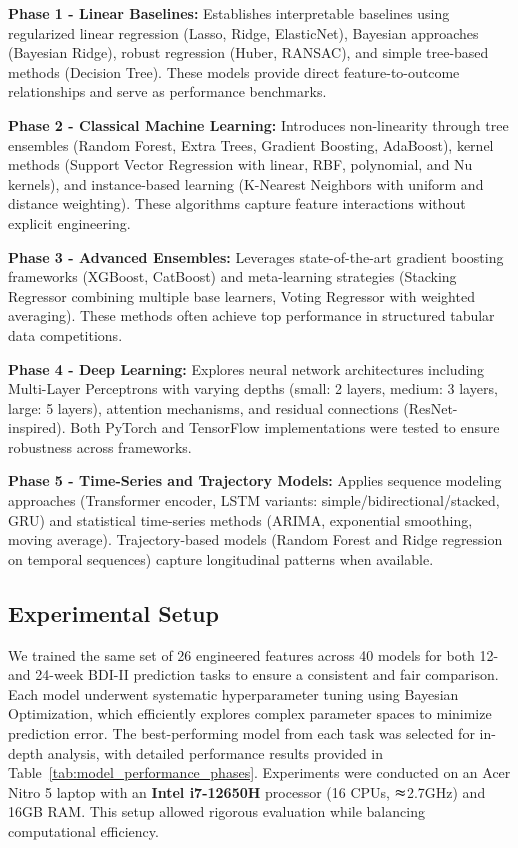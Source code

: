 \documentclass[conference]{IEEEtran}
\begin{document}
\textbf{Phase 1 - Linear Baselines:} Establishes interpretable baselines using regularized linear regression (Lasso, Ridge, ElasticNet), Bayesian approaches (Bayesian Ridge), robust regression (Huber, RANSAC), and simple tree-based methods (Decision Tree). These models provide direct feature-to-outcome relationships and serve as performance benchmarks.

\textbf{Phase 2 - Classical Machine Learning:} Introduces non-linearity through tree ensembles (Random Forest, Extra Trees, Gradient Boosting, AdaBoost), kernel methods (Support Vector Regression with linear, RBF, polynomial, and Nu kernels), and instance-based learning (K-Nearest Neighbors with uniform and distance weighting). These algorithms capture feature interactions without explicit engineering.

\textbf{Phase 3 - Advanced Ensembles:} Leverages state-of-the-art gradient boosting frameworks (XGBoost, CatBoost) and meta-learning strategies (Stacking Regressor combining multiple base learners, Voting Regressor with weighted averaging). These methods often achieve top performance in structured tabular data competitions.

\textbf{Phase 4 - Deep Learning:} Explores neural network architectures including Multi-Layer Perceptrons with varying depths (small: 2 layers, medium: 3 layers, large: 5 layers), attention mechanisms, and residual connections (ResNet-inspired). Both PyTorch and TensorFlow implementations were tested to ensure robustness across frameworks.

\textbf{Phase 5 - Time-Series and Trajectory Models:} Applies sequence modeling approaches (Transformer encoder, LSTM variants: simple/bidirectional/stacked, GRU) and statistical time-series methods (ARIMA, exponential smoothing, moving average). Trajectory-based models (Random Forest and Ridge regression on temporal sequences) capture longitudinal patterns when available.


\subsection{Experimental Setup}
We trained the same set of 26 engineered features across 40 models for both 12- and 24-week BDI-II prediction tasks to ensure a consistent and fair comparison. Each model underwent systematic hyperparameter tuning using Bayesian Optimization, which efficiently explores complex parameter spaces to minimize prediction error. The best-performing model from each task was selected for in-depth analysis, with detailed performance results provided in Table~\ref{tab:model_performance_phases}. Experiments were conducted on an Acer Nitro 5 laptop with an \textbf{Intel i7-12650H} processor (16 CPUs, $\thickapprox$2.7GHz) and 16GB RAM. This setup allowed rigorous evaluation while balancing computational efficiency.
\end{document}
